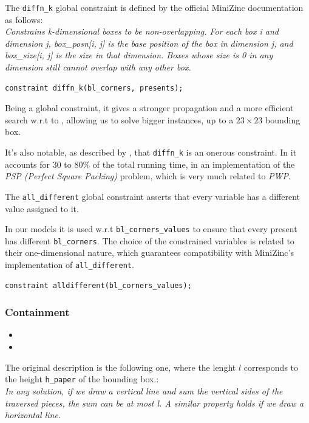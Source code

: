 \documentclass[a4paper,10pt]{article}
\newcounter{subsubsubsection}[subsubsection]
\begin{document}
 \label{sec:diffnk}
The \texttt{diffn\_k} global constraint is defined by the official MiniZinc documentation \cite{minizinc} as follows: \\
\emph{Constrains k-dimensional boxes to be non-overlapping. For each box i and dimension j, box\_posn[i, j] is the base position of the box in dimension j, and box\_size[i, j] is the size in that dimension. Boxes whose size is 0 in any dimension still cannot overlap with any other box.}
\begin{Verbatim}[samepage=true]
   constraint diffn_k(bl_corners, presents);
\end{Verbatim}
Being a global constraint, it gives a stronger propagation and a more efficient search w.r.t to , allowing us to solve bigger instances, up to a $23 \times 23$ bounding box.

It's also notable, as described by \cite{sweep}, that \texttt{diffn\_k} is an onerous constraint. In \cite{sweep} it accounts for 30 to 80\% of the total running time, in an implementation of the \emph{PSP (Perfect Square Packing)} problem, which is very much related to \emph{PWP}.

 \label{sec:different-bl-corners}
The \texttt{all\_different} global constraint asserts that every variable has a different value assigned to it.

In our models it is used w.r.t \texttt{bl\_corners\_values} to ensure that every present has different \texttt{bl\_corners}. The choice of the constrained variables is related to their one-dimensional nature, which guarantees compatibility with MiniZinc's implementation of \texttt{all\_different}.
\begin{Verbatim}[samepage=true]
   constraint alldifferent(bl_corners_values);
\end{Verbatim}

\subsubsection{Containment}
\begin{itemize}
   \item {}
   \item {}
\end{itemize}

 \label{sec:reduce-presents-domains}
The original description is the following one, where the lenght $l$ corresponds to the height \texttt{h\_paper} of the bounding box.:\\
\emph{In any solution, if we draw a vertical line and sum the vertical sides of the traversed pieces, the sum can be at most l. A similar property holds if we draw a horizontal line.}
\end{document}
